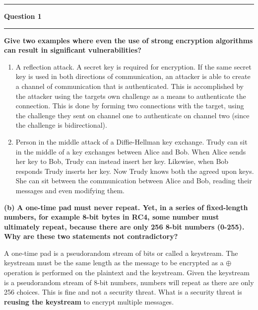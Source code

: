 \documentclass[11pt]{article}
\newcommand\question[2]{\vspace{.25in}\hrule\textbf{#1}\vspace{.5em}\hrule\vspace{.10in}}
\renewcommand\part[1]{\vspace{.10in}\textbf{(#1)}}
\begin{document}
\raggedright
\newcommand\NAME{Jake Pitkin}  %
\newcommand\UID{u0891770}     %
\newcommand\HWNUM{2}              %

\question{Question 1}

\part{a} \textbf{Give two examples where even the use of strong encryption algorithms
can result in significant vulnerabilities?}
\begin{enumerate}
  \item A reflection attack. A secret key is required for encryption. If the same secret key is used in both directions of communication, an attacker is able to create a channel of communication that is authenticated. This is accomplished by the attacker using the targets own challenge as a means to authenticate the connection. This is done by forming two connections with the target, using the challenge they sent on channel one to authenticate on channel two (since the challenge is bidirectional).
  \item Person in the middle attack of a Diffie-Hellman key exchange. Trudy can sit in the middle of a key exchanges between Alice and Bob. When Alice sends her key to Bob, Trudy can instead insert her key. Likewise, when Bob responds Trudy inserts her key. Now Trudy knows both the agreed upon keys. She can sit between the communication between Alice and Bob, reading their messages and even modifying them.
  \end{enumerate}

\part{b} \textbf{A one-time pad must never repeat. Yet, in a series of fixed-length numbers, for example 8-bit bytes in RC4, some number must ultimately repeat, because there are only 256 8-bit numbers (0-255). Why are these two statements not contradictory?} \newline

A one-time pad is a pseudorandom stream of bits or called a keystream. The keystream must be the same length as the message to be encrypted as a $\oplus$ operation is performed on the plaintext and the keystream. Given the keystream is a pseudorandom stream of 8-bit numbers, numbers will repeat as there are only 256 choices. This is fine and not a security threat. What is a security threat is \textbf{reusing the keystream} to encrypt multiple messages.
\end{document}
